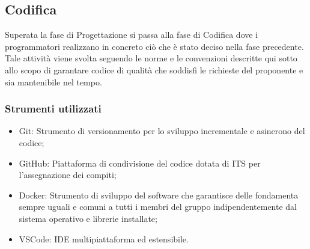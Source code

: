 \subsection{Codifica}
Superata la fase di Progettazione si passa alla fase di Codifica dove i programmatori
realizzano in concreto ciò che è stato deciso nella fase precedente.
Tale attività viene svolta seguendo le norme e le convenzioni descritte qui sotto allo
scopo di garantare codice di qualità che soddisfi le richieste del proponente e sia mantenibile nel tempo.

\subsubsection{Strumenti utilizzati}
    \begin{itemize}
    \item Git: Strumento di versionamento per lo sviluppo incrementale e asincrono del codice;
    \item GitHub: Piattaforma di condivisione del codice dotata di ITS per l'assegnazione dei compiti;
    \item Docker: Strumento di sviluppo del software che garantisce delle fondamenta sempre uguali e comuni a tutti i membri del gruppo indipendentemente dal sistema operativo e librerie installate;
    \item VSCode: IDE multipiattaforma ed estensibile.
    \end{itemize}
